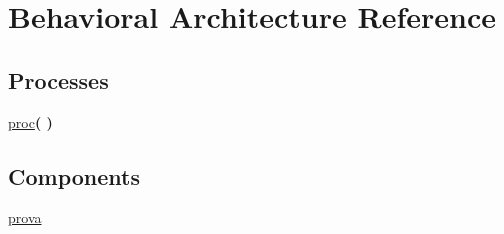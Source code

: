 \hypertarget{classtb__prova_1_1_behavioral}{\section{Behavioral Architecture Reference}
\label{classtb__prova_1_1_behavioral}
}
\subsection*{Processes}
 \begin{DoxyCompactItemize}
\item 
\hyperlink{classtb__prova_1_1_behavioral_a9dc63c348ab8ba8b5a85ef98dcd7d147}{proc}{\bfseries  (  )}
\end{DoxyCompactItemize}
\subsection*{Components}
 \begin{DoxyCompactItemize}
\item 
\hyperlink{classtb__prova_1_1_behavioral_a147e03ab3bf33e06c20b8794da0ed9c7}{prova}  {\bfseries }  
\end{DoxyCompactItemize}
